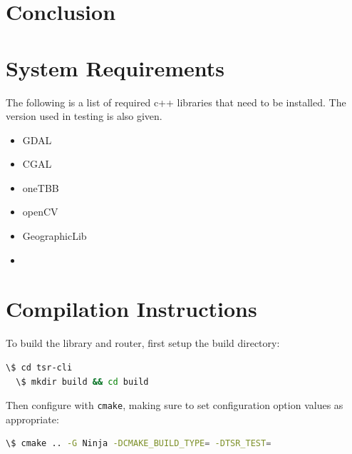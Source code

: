 \documentclass[12pt]{article}
\begin{document}
\section{Conclusion}

\pagebreak

\nocite{esa2024dem}
\nocite{cgal:eb-24b}
\nocite{rouault_2022_6517191}
\nocite{wiki:osm}
\nocite{gtest}
\nocite{fmtlib}
\nocite{opencv_library}
\nocite{oneTBB}
\nocite{tin_terrain_logging}
\nocite{libboost}
\nocite{geographiclib}

\printbibliography[heading=bibnumbered]{}

\pagebreak
\begin{appendices}

  \section{System Requirements}

  The following is a list of required c++ libraries that need to be installed. The version used in testing is also given.

  \begin{itemize}
    \item GDAL
    \item CGAL
    \item oneTBB
    \item openCV
    \item GeographicLib
    \item
  \end{itemize}

  \section{Compilation Instructions}

  To build the library and router, first setup the build directory:

  \begin{lstlisting}[language=bash]
  \$ cd tsr-cli
  \$ mkdir build && cd build
\end{lstlisting}

  \noindent Then configure with \texttt{cmake}, making sure to set configuration option values as appropriate:

  \begin{lstlisting}[language=bash]
  \$ cmake .. -G Ninja -DCMAKE_BUILD_TYPE= -DTSR_TEST=
\end{lstlisting}

  \vspace*{-2em}


\end{appendices}
\end{document}
